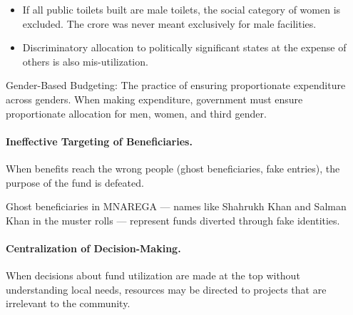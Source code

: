 \begin{ExampleBox}
\begin{itemize}
\item If all public toilets built are male toilets, the social category of women is excluded. The  crore was never meant exclusively for male facilities.
\item Discriminatory allocation to politically significant states at the expense of others is also mis-utilization.
\end{itemize}
\end{ExampleBox}

\begin{GovtPolicy}
Gender-Based Budgeting: The practice of ensuring proportionate expenditure across genders. When making expenditure, government must ensure proportionate allocation for men, women, and third gender.
\end{GovtPolicy}

\paragraph{Ineffective Targeting of Beneficiaries.} When benefits reach the wrong people (ghost beneficiaries, fake entries), the purpose of the fund is defeated.

\begin{ExampleBox}
Ghost beneficiaries in MNAREGA --- names like Shahrukh Khan and Salman Khan in the muster rolls --- represent funds diverted through fake identities.
\end{ExampleBox}

\paragraph{Centralization of Decision-Making.} When decisions about fund utilization are made at the top without understanding local needs, resources may be directed to projects that are irrelevant to the community.

